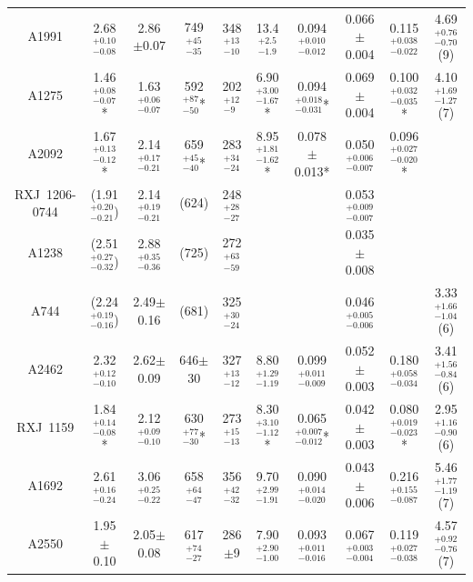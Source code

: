 \documentclass{aastex}
\begin{document}
\begin{table}
\begin{center}
{\begin{tabular}{cccccccccc}
A1991 & 2.68$^{+0.10}_{-0.08}$ & 2.86$\pm0.07$ & 749$^{+45}_{-35}$ & 348$^{+13}_{-10}$ & 13.4$^{+2.5}_{-1.9}$ & 0.094$^{+0.010}_{-0.012}$ & 0.066$\pm$0.004 & 0.115$^{+0.038}_{-0.022}$ & 4.69$^{+0.76}_{-0.70}$ (9) \\
A1275 & 1.46$^{+0.08}_{-0.07}$* & 1.63$^{+0.06}_{-0.07}$ & 592$^{+87}_{-50}$* & 202$^{+12}_{-9}$ & 6.90$^{+3.00}_{-1.67}$* & 0.094$^{+0.018}_{-0.031}$* & 0.069$\pm$0.004 & 0.100$^{+0.032}_{-0.035}$* & 4.10$^{+1.69}_{-1.27}$ (7) \\
A2092 & 1.67$^{+0.13}_{-0.12}$* & 2.14$^{+0.17}_{-0.21}$ & 659$^{+45}_{-40}$* & 283$^{+34}_{-24}$ & 8.95$^{+1.81}_{-1.62}$* & 0.078$\pm$0.013* & 0.050$^{+0.006}_{-0.007}$ & 0.096$^{+0.027}_{-0.020}$* & \\
RXJ~1206-0744 & (1.91$^{+0.20}_{-0.21}$) & 2.14$^{+0.19}_{-0.21}$ & (624) & 248$^{+28}_{-27}$ & & & 0.053$^{+0.009}_{-0.007}$ & & \\
A1238    & (2.51$^{+0.27}_{-0.32}$)& 2.88$^{+0.35}_{-0.36}$ & (725) & 272$^{+63}_{-59}$ & & & 0.035$\pm$0.008 & & \\
A744     & (2.24$^{+0.19}_{-0.16}$) & 2.49$\pm$0.16 & (681) & 325$^{+30}_{-24}$ & & & 0.046$^{+0.005}_{-0.006}$ & & 3.33$^{+1.66}_{-1.04}$ (6) \\
A2462    & 2.32$^{+0.12}_{-0.10}$ & 2.62$\pm$0.09 & 646$\pm$30 & 327$^{+13}_{-12}$ & 8.80$^{+1.29}_{-1.19}$ & 0.099$^{+0.011}_{-0.009}$ & 0.052$\pm$0.003 & 0.180$^{+0.058}_{-0.034}$ & 3.41$^{+1.56}_{-0.84}$ (6) \\
RXJ~1159 & 1.84$^{+0.14}_{-0.08}$* & 2.12$^{+0.09}_{-0.10}$ & 630$^{+77}_{-30}$* & 273$^{+15}_{-13}$ & 8.30$^{+3.10}_{-1.12}$* & 0.065$^{+0.007}_{-0.012}$* & 0.042$\pm$0.003 & 0.080$^{+0.019}_{-0.023}$* & 2.95$^{+1.16}_{-0.90}$ (6) \\
A1692    & 2.61$^{+0.16}_{-0.24}$ & 3.06$^{+0.25}_{-0.22}$ & 658$^{+64}_{-47}$ & 356$^{+42}_{-32}$ & 9.70$^{+2.99}_{-1.91}$ & 0.090$^{+0.014}_{-0.020}$ & 0.043$\pm$0.006 & 0.216$^{+0.155}_{-0.087}$ & 5.46$^{+1.77}_{-1.19}$ (7) \\
A2550    & 1.95$\pm$0.10 & 2.05$\pm$0.08 & 617$^{+74}_{-27}$ & 286$\pm$9 & 7.90$^{+2.90}_{-1.00}$ & 0.093$^{+0.011}_{-0.016}$ & 0.067$^{+0.003}_{-0.004}$ & 0.119$^{+0.027}_{-0.038}$ & 4.57$^{+0.92}_{-0.76}$ (7) \\
\hline \hline
\end{tabular}}
\vspace{-1.2cm}
\begin{flushleft}
\leftskip 35pt
\end{flushleft}
\end{center}
\end{table}
\end{document}
